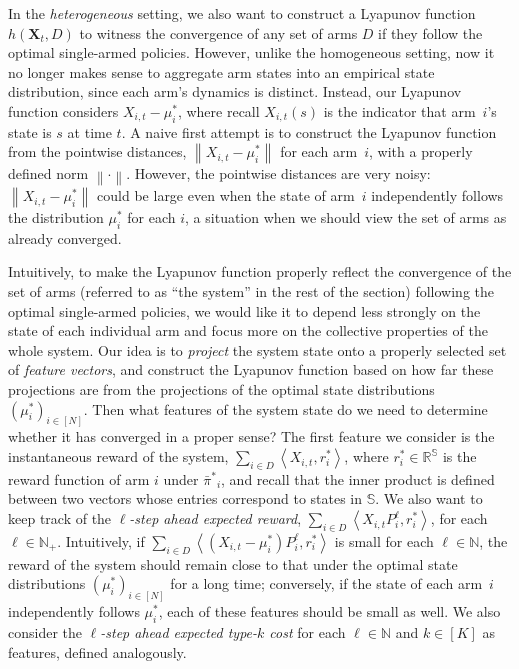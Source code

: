\documentclass{article}
\theoremstyle{plain}
\theoremstyle{remark}
\newcommand{\norm}[1]{\left\lVert#1\right\rVert}
\newcommand{\R}{\mathbb{R}}
\newcommand{\sspa}{\mathbb{S}}
\newcommand{\pibar}{{\sysbar{\pi}}}
\newcommand{\pibs}{{\pibar^*}}
\newcommand{\sysbar}[1]{\bar{#1}}
\def\mX{{\bm{X}}}
\newcommand{\innerproduct}[2]{\left\langle #1, #2 \right\rangle}
\begin{document}
In the \emph{heterogeneous} setting, we also want to construct a Lyapunov function $h(\mX_t, D)$ to witness the convergence of any set of arms $D$ if they  follow the optimal single-armed policies. 
However, unlike the homogeneous setting, now it no longer makes sense to aggregate arm states into an empirical state distribution, since each arm's dynamics is distinct.
Instead, our Lyapunov function considers $X_{i,t}-\mu_i^*$, where recall $X_{i,t}(s)$ is the indicator that arm~$i$'s state is $s$ at time $t$. 
A naive first attempt is to construct the Lyapunov function from the pointwise distances, $\norm{X_{i,t}-\mu_i^*}$ for each arm~$i$, with a properly defined norm $\norm{\cdot}$. 
However, the pointwise distances are very noisy: $\norm{X_{i,t}-\mu_i^*}$  could be large even when the state of arm~$i$ independently follows the distribution $\mu_i^*$ for each $i$, a situation when we should view the set of arms as already converged. 

Intuitively, to make the Lyapunov function properly reflect the convergence of the set of arms (referred to as ``the system'' in the rest of the section) following the optimal single-armed policies, we would like it to depend less strongly on the state of each individual arm and focus more on the collective properties of the whole system. 
Our idea is to \emph{project} the system state onto a properly selected set of \emph{feature vectors}, and construct the Lyapunov function based on how far these projections are from the projections of the optimal state distributions $(\mu^*_i)_{i\in[N]}$. 
Then what features of the system state do we need to determine whether it has converged in a proper sense? 
The first feature we consider is the instantaneous reward of the system, $\sum_{i\in D} \innerproduct{X_{i,t}}{r_i^*}$, where $r_i^*\in \R^{\sspa}$ is the reward function of arm $i$ under $\pibs_i$, and recall that the inner product is defined between two vectors whose entries correspond to states in $\sspa$. 
We also want to keep track of the \emph{$\ell$-step ahead expected reward}, $\sum_{i\in D} \innerproduct{X_{i,t}P_i^{\ell}}{r_i^*}$, for each $\ell\in \mathbb{N}_+$. 
Intuitively, if $\sum_{i\in D} \innerproduct{(X_{i,t} -\mu_i^*)P_i^{\ell}}{r_i^*}$ is small for each $\ell\in \mathbb{N}$, the reward of the system should remain close to that under the optimal state distributions $(\mu^*_i)_{i\in[N]}$ for a long time; conversely, if the state of each arm~$i$ independently follows $\mu^*_i$, each of these features should be small as well. 
We also consider the \emph{$\ell$-step ahead expected type-$k$ cost} for each $\ell\in \mathbb{N}$ and $k\in [K]$ as features, defined analogously.  
\end{document}
